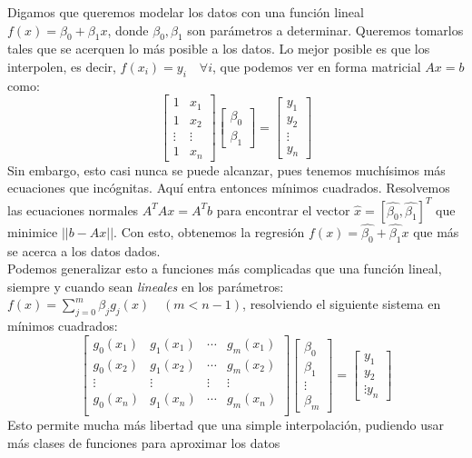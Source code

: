 \documentclass[12pt]{article}
\begin{document}
Digamos que queremos modelar los datos con una función lineal $f(x) = \beta_0 + \beta_1 x$, donde $\beta_0,\beta_1$ son parámetros a determinar. Queremos tomarlos tales que se acerquen lo más posible a los datos. Lo mejor posible es que los interpolen, es decir, $f(x_i) = y_i \quad \forall i$, que podemos ver en forma matricial $Ax=b$ como:
\[ \begin{bmatrix} 1 & x_1  \\ 1 & x_2  \\ \vdots & \vdots  \\ 1 & x_n \end{bmatrix} \begin{bmatrix} \beta_0 \\ \beta_1 \end{bmatrix} = \begin{bmatrix} y_1 \\ y_2 \\ \vdots \\ y_n \end{bmatrix}\]
Sin embargo, esto casi nunca se puede alcanzar, pues tenemos muchísimos más ecuaciones que incógnitas. Aquí entra entonces mínimos cuadrados. Resolvemos las ecuaciones normales $A^T A x = A^T b$ para encontrar el vector $\hat{x} = [\hat{\beta_0},\hat{\beta_1}]^T$ que minimice $||b-Ax||$. Con esto, obtenemos la regresión $f(x) = \hat{\beta_0} + \hat{\beta_1}x$ que más se acerca a los datos dados.\\
Podemos generalizar esto a funciones más complicadas que una función lineal, siempre y cuando sean \textit{lineales} en los parámetros: $f(x) = \sum_{j=0}^m \beta_j g_j(x) \quad (m<n-1)$, resolviendo el siguiente sistema en mínimos cuadrados:
\[ \begin{bmatrix}
    g_0(x_1) & g_1(x_1) & \cdots & g_m(x_1) \\
    g_0(x_2) & g_1(x_2) & \cdots & g_m(x_2) \\
    \vdots & \vdots & \vdots & \vdots \\
    g_0(x_n) & g_1(x_n) & \cdots & g_m(x_n) \\
\end{bmatrix}\begin{bmatrix}
    \beta_0 \\
    \beta_1 \\
    \vdots \\
    \beta_m
\end{bmatrix} = \begin{bmatrix}
    y_1 \\
    y_2 \\
    \vdots
    y_n
\end{bmatrix} \]
Esto permite mucha más libertad que una simple interpolación, pudiendo usar más clases de funciones para aproximar los datos
\\
\end{document}
